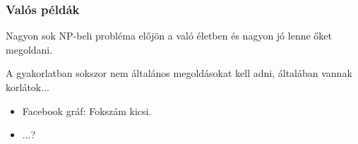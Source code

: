 \begin{frame}
\frametitle{Valós példák}
Nagyon sok NP-beli probléma előjön a való életben és nagyon jó lenne őket megoldani.

A gyakorlatban sokszor nem általános megoldásokat kell adni, általában vannak korlátok...

\begin{itemize}
\item Facebook gráf: Fokszám kicsi.
\item ...?
\end{itemize}

\end{frame}

